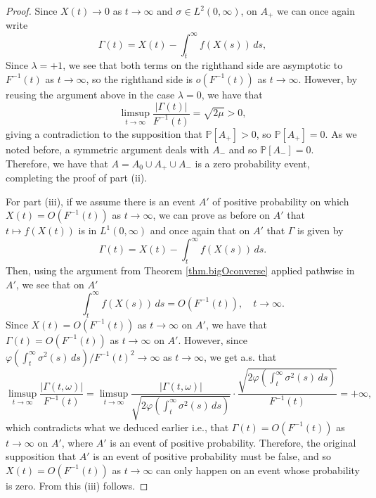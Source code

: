 \documentclass[10pt,a4paper]{amsart}
\begin{document}
\begin{proof}
		Since $X(t)\to 0$ as $t\to\infty$ and $\sigma\in L^2(0,\infty)$, on $A_+$ we can once again write
		\[
		\Gamma(t) = X(t) - \int_t^\infty f(X(s)) \, ds,
		\]
		Since $\lambda=+1$, we see that both terms on the righthand side are asymptotic to $F^{-1}(t)$ as $t\to\infty$, so the righthand side is $o(F^{-1}(t))$ as $t\to\infty$. However, by reusing the argument above in the case $\lambda=0$, we have that 
		\[
		\limsup_{t\to\infty} \frac{|\Gamma(t)|}{F^{-1}(t)}=\sqrt{2\mu}>0,
		\] 
		giving a contradiction to the supposition that $\mathbb{P}[A_+]>0$, so $\mathbb{P}[A_+]=0$.
		As we noted before, a symmetric argument deals with $A_-$ and so $\mathbb{P}[A_-]=0$. Therefore, we have that $A=A_0\cup A_+\cup A_-$ is a zero probability event, completing the proof of part (ii).  
		
		For part (iii), if we assume there is an event $A'$ of positive probability on which $X(t)=O(F^{-1}(t))$ as $t\to\infty$, we can prove as before on $A'$ that $t\mapsto f(X(t))$ is in $L^1(0,\infty)$ and once again that on $A'$ that $\Gamma$ is given by 
		\[
		\Gamma(t) = X(t) - \int_t^\infty f(X(s)) \, ds.
		\]
		Then, using the argument from Theorem \ref{thm.bigOconverse} applied pathwise in $A'$, we see that on $A'$
		\[
		\int_t^\infty f(X(s)) \, ds = O(F^{-1}(t)), \quad t\to\infty.
		\]
		Since $X(t)=O(F^{-1}(t))$ as $t\to\infty$ on $A'$, we have that 
		$\Gamma(t)=O(F^{-1}(t))$ as $t\to\infty$ on $A'$. However, since 
		$\varphi(\int_t^\infty \sigma^2(s)\,ds)/F^{-1}(t)^2\to \infty$ as $t\to\infty$, we get a.s. that 
		\[
		\limsup_{t \to \infty} \frac{|\Gamma(t,\omega)|}{F^{-1}(t)}
		= \limsup_{t \to \infty} \frac{|\Gamma(t,\omega)|}
		{\sqrt{2 \varphi\!\left(\int_t^\infty \sigma^2(s)\, ds\right)}} 
		\cdot
		\frac{\sqrt{2 \varphi\!\left(\int_t^\infty \sigma^2(s)\, ds\right)}}{F^{-1}(t)}=+\infty,
		\]
		which contradicts what we deduced earlier i.e., that $\Gamma(t)=O(F^{-1}(t))$ as $t\to\infty$ on $A'$, where $A'$ is an event of positive probability. Therefore, the original supposition that $A'$ is an event of positive probability must be false, and so 
		$X(t)=O(F^{-1}(t))$ as $t\to\infty$ can only happen on an event whose probability is zero. From this (iii) follows. 
	\end{proof}
\end{document}
